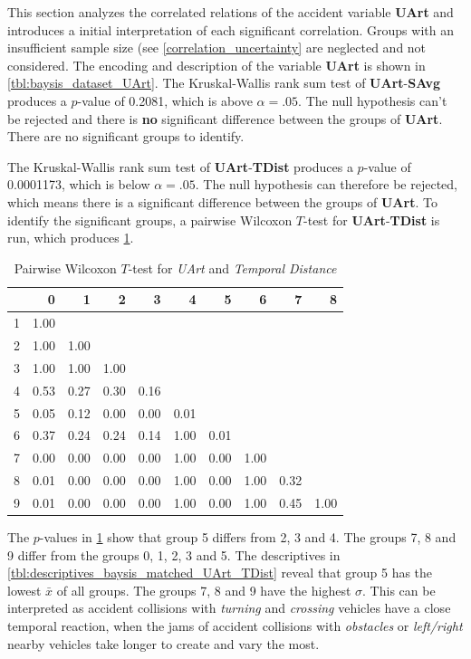 This section analyzes the correlated relations of the accident variable \textbf{UArt} and introduces a initial interpretation of each significant correlation. Groups with an insufficient sample size (see \cref{correlation_uncertainty} are neglected and not considered. The encoding and description of the variable \textbf{UArt} is shown in \cref{tbl:baysis_dataset_UArt}. The Kruskal-Wallis rank sum test of \textbf{UArt}-\textbf{SAvg} produces a $p$-value of 0.2081, which is above $\alpha=.05$. The null hypothesis can't be rejected and there is \textbf{no} significant difference between the groups of \textbf{UArt}. There are no significant groups to identify.

The Kruskal-Wallis rank sum test of \textbf{UArt}-\textbf{TDist} produces a $p$-value of 0.0001173, which is below $\alpha=.05$. The null hypothesis can therefore be rejected, which means there is a significant difference between the groups of \textbf{UArt}. To identify the significant groups, a pairwise Wilcoxon $T$-test for \textbf{UArt}-\textbf{TDist} is run, which produces \cref{tbl:wilcoxon_baysis_matched_UArt_TDist}. 
\begin{table}[ht]
	\small
	\centering
	\begin{tabular}{rrrrrrrrrr}
  		\toprule
		& 0 & 1 & 2 & 3 & 4 & 5 & 6 & 7 & 8 \\ 
		\midrule
		1 & 1.00 &  &  &  &  &  &  &  &  \\ 
		2 & 1.00 & 1.00 &  &  &  &  &  &  &  \\ 
		3 & 1.00 & 1.00 & 1.00 &  &  &  &  &  &  \\ 
		4 & 0.53 & 0.27 & 0.30 & 0.16 &  &  &  &  &  \\ 
		5 & 0.05 & 0.12 & 0.00 & 0.00 & 0.01 &  &  &  &  \\ 
		6 & 0.37 & 0.24 & 0.24 & 0.14 & 1.00 & 0.01 &  &  &  \\ 
		7 & 0.00 & 0.00 & 0.00 & 0.00 & 1.00 & 0.00 & 1.00 &  &  \\ 
		8 & 0.01 & 0.00 & 0.00 & 0.00 & 1.00 & 0.00 & 1.00 & 0.32 &  \\ 
		9 & 0.01 & 0.00 & 0.00 & 0.00 & 1.00 & 0.00 & 1.00 & 0.45 & 1.00 \\ 
		\bottomrule
	\end{tabular}
	\caption{Pairwise Wilcoxon $T$-test for \textit{UArt} and \textit{Temporal Distance}}
	\label{tbl:wilcoxon_baysis_matched_UArt_TDist}
\end{table}
The $p$-values in \cref{tbl:wilcoxon_baysis_matched_UArt_TDist} show that group 5 differs from 2, 3 and 4. The groups 7, 8 and 9 differ from the groups 0, 1, 2, 3 and 5. The descriptives in \cref{tbl:descriptives_baysis_matched_UArt_TDist} reveal that group 5 has the lowest $\bar{x}$ of all groups. The groups 7, 8 and 9 have the highest $\sigma$. This can be interpreted as accident collisions with \textit{turning} and \textit{crossing} vehicles have a close temporal reaction, when the jams of accident collisions with \textit{obstacles} or \textit{left/right} nearby vehicles take longer to create and vary the most.

